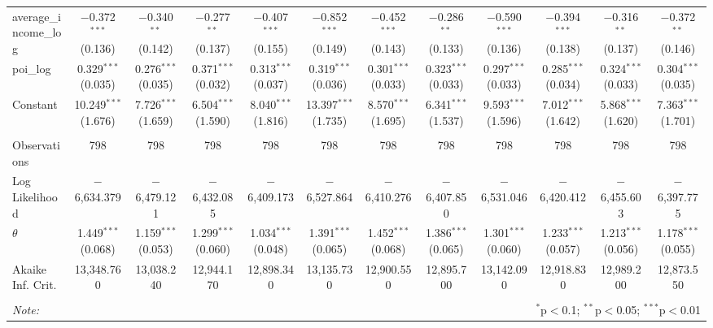 \begin{table}[!htbp]
\begin{tabular}{@{\extracolsep{1pt}}lccccccccccc}
  average\_income\_log & $-$0.372$^{***}$ (0.136) & $-$0.340$^{**}$ (0.142) & $-$0.277$^{**}$ (0.137) & $-$0.407$^{***}$ (0.155) & $-$0.852$^{***}$ (0.149) & $-$0.452$^{***}$ (0.143) & $-$0.286$^{**}$ (0.133) & $-$0.590$^{***}$ (0.136) & $-$0.394$^{***}$ (0.138) & $-$0.316$^{**}$ (0.137) & $-$0.372$^{**}$ (0.146) \\ 
  poi\_log & 0.329$^{***}$ (0.035) & 0.276$^{***}$ (0.035) & 0.371$^{***}$ (0.032) & 0.313$^{***}$ (0.037) & 0.319$^{***}$ (0.036) & 0.301$^{***}$ (0.033) & 0.323$^{***}$ (0.033) & 0.297$^{***}$ (0.033) & 0.285$^{***}$ (0.034) & 0.324$^{***}$ (0.033) & 0.304$^{***}$ (0.035) \\ 
  Constant & 10.249$^{***}$ (1.676) & 7.726$^{***}$ (1.659) & 6.504$^{***}$ (1.590) & 8.040$^{***}$ (1.816) & 13.397$^{***}$ (1.735) & 8.570$^{***}$ (1.695) & 6.341$^{***}$ (1.537) & 9.593$^{***}$ (1.596) & 7.012$^{***}$ (1.642) & 5.868$^{***}$ (1.620) & 7.363$^{***}$ (1.701) \\ 
 \hline \\[-1.8ex] 
Observations & 798 & 798 & 798 & 798 & 798 & 798 & 798 & 798 & 798 & 798 & 798 \\ 
Log Likelihood & $-$6,634.379 & $-$6,479.121 & $-$6,432.085 & $-$6,409.173 & $-$6,527.864 & $-$6,410.276 & $-$6,407.850 & $-$6,531.046 & $-$6,420.412 & $-$6,455.603 & $-$6,397.775 \\ 
$\theta$ & 1.449$^{***}$  (0.068) & 1.159$^{***}$  (0.053) & 1.299$^{***}$  (0.060) & 1.034$^{***}$  (0.048) & 1.391$^{***}$  (0.065) & 1.452$^{***}$  (0.068) & 1.386$^{***}$  (0.065) & 1.301$^{***}$  (0.060) & 1.233$^{***}$  (0.057) & 1.213$^{***}$  (0.056) & 1.178$^{***}$  (0.055) \\ 
Akaike Inf. Crit. & 13,348.760 & 13,038.240 & 12,944.170 & 12,898.340 & 13,135.730 & 12,900.550 & 12,895.700 & 13,142.090 & 12,918.830 & 12,989.200 & 12,873.550 \\ 
\hline 
\hline \\[-1.8ex] 
\textit{Note:}  & \multicolumn{11}{r}{$^{*}$p$<$0.1; $^{**}$p$<$0.05; $^{***}$p$<$0.01} \\ 
\end{tabular} 
\end{table} 
